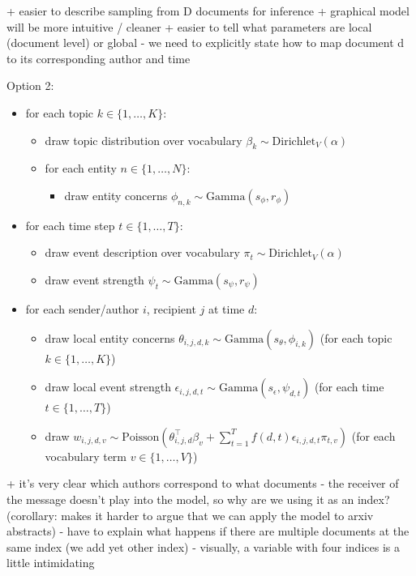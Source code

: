+ easier to describe sampling from D documents for inference
+ graphical model will be more intuitive / cleaner
+ easier to tell what parameters are local (document level) or global
- we need to explicitly state how to map document d to its corresponding author and time



Option 2:
\begin{itemize}
\item for each topic $k \in \{1,\dots, K\}$:
	\begin{itemize}
	\item draw topic distribution over vocabulary $\beta_k \sim \mbox{Dirichlet}_V (\alpha)$
	\item for each entity $n \in \{1,\dots, N\}$:
		\begin{itemize}
		\item draw entity concerns $\phi_{n,k} \sim \mbox{Gamma}(s_\phi, r_\phi)$
		\end{itemize}
	\end{itemize}
\item for each time step $t \in \{1,\dots, T\}$:
	\begin{itemize}
	\item draw event description over vocabulary $\pi_t \sim \mbox{Dirichlet}_V (\alpha)$
	\item draw event strength $\psi_{t} \sim \mbox{Gamma}(s_\psi, r_\psi)$
	\end{itemize}
\item for each sender/author $i$, recipient $j$ at time $d$:
	\begin{itemize}
	\item draw local entity concerns $\theta_{i,j,d,k} \sim \mbox{Gamma}(s_\theta, \phi_{i,k})$ (for each topic $k \in \{1,\dots, K\}$)
	\item draw local event strength $\epsilon_{i,j,d,t} \sim \mbox{Gamma}(s_\epsilon, \psi_{d,t})$ (for each time $t \in \{1,\dots, T\}$)
	\item draw $w_{i,j,d,v} \sim \mbox{Poisson}(\theta_{i,j,d}^\top\beta_v + \sum_{t=1}^T f(d, t) \epsilon_{i,j,d,t} \pi_{t,v} )$ (for each vocabulary term $v \in \{1,\dots,V\}$)
	\end{itemize}
\end{itemize}


+ it's very clear which authors correspond to what documents
- the receiver of the message doesn't play into the model, so why are we using it as an index? (corollary: makes it harder to argue that we can apply the model to arxiv abstracts)
- have to explain what happens if there are multiple documents at the same index (we add yet other index)
- visually, a variable with four indices is a little intimidating


